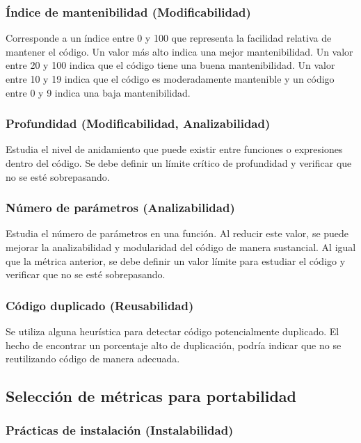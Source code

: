 \subsubsection{Índice de mantenibilidad (Modificabilidad)}

Corresponde a un índice entre 0 y 100 que representa la facilidad relativa
de mantener el código. Un valor más alto indica una mejor mantenibilidad. Un valor entre 20 y 100
indica que el código tiene una buena mantenibilidad. Un valor entre 10 y 19 indica que el código es
moderadamente mantenible y un código entre 0 y 9 indica una baja mantenibilidad.

\subsubsection{Profundidad (Modificabilidad, Analizabilidad)}
Estudia el nivel de anidamiento que puede existir entre funciones o expresiones dentro del código.
Se debe definir un límite crítico de profundidad y verificar que no se esté sobrepasando.

\subsubsection{Número de parámetros (Analizabilidad)}
Estudia el número de parámetros en una función.
Al reducir este valor, se puede mejorar la analizabilidad y modularidad del código de manera sustancial.
Al igual que la métrica anterior, se debe definir un valor límite para estudiar el código y verificar que
no se esté sobrepasando.

\subsubsection{Código duplicado (Reusabilidad)}

Se utiliza alguna heurística para detectar código potencialmente duplicado.
El hecho de encontrar un porcentaje alto de duplicación, podría indicar que no se reutilizando
código de manera adecuada.

\subsection{Selección de métricas para portabilidad}

\subsubsection{Prácticas de instalación (Instalabilidad)}

